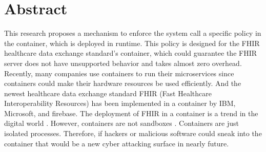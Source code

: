 \chapter*{Abstract}

This research proposes
a mechanism to enforce the system call a specific policy in the container, which is deployed in
runtime. This policy is designed for the FHIR healthcare data exchange standard's container, which
could guarantee the FHIR server does not have unsupported behavior and takes almost zero overhead.
Recently, many companies use containers to run their microservices since containers could
make their hardware resources be used efficiently. And the newest healthcare data exchange
standard FHIR (Fast Healthcare Interoperability Resources) \cite{FHIR_home} has been implemented
in a container by IBM, Microsoft, and firebase. The deployment of FHIR in a container is a trend
in the digital world \cite{Infrastructures} . However, containers are not sandboxes \cite{10.5555/1267569.1267570}
. Containers are just isolated processes. Therefore, if hackers or malicious software could sneak
into the container that would be a new cyber attacking surface in nearly future.